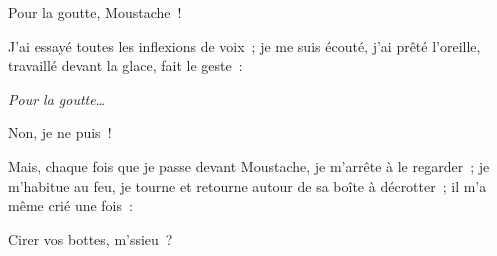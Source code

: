\documentclass[french,twoside]{book} %
\newenvironment{quoteblock}%
  {\begin{quoting}}
  {\end{quoting}}
\newenvironment{quotebar}{%
    \def\FrameCommand{{\color{rubric!10!}\vrule width 0.5em} \hspace{0.9em}}%
    \def\OuterFrameSep{\itemsep} %
    \MakeFramed {\advance\hsize-\width \FrameRestore}
  }%
  {%
    \endMakeFramed
  }
\renewenvironment{quoteblock}%
  {%
    \savenotes
    \setstretch{0.9}
    \normalfont
    \begin{quotebar}
  }
  {%
    \end{quotebar}
    \spewnotes
  }
\begin{document}
\begin{quoteblock}
\noindent Pour la goutte, Moustache !\end{quoteblock}

\noindent J’ai essayé toutes les inflexions de voix ; je me suis écouté, j’ai prêté l’oreille, travaillé devant la glace, fait le geste :\par
\emph{Pour la goutte}…\par
Non, je ne puis !\par
Mais, chaque fois que je passe devant Moustache, je m’arrête à le regarder ; je m’habitue au feu, je tourne et retourne autour de sa boîte à décrotter ; il m’a même crié une fois :\par

\begin{quoteblock}
\noindent Cirer vos bottes, m’ssieu ?\end{quoteblock}
\end{document}
